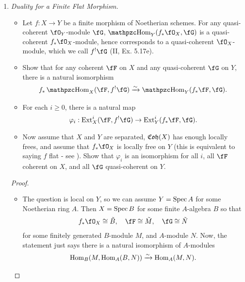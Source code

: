 \documentclass[a4paper]{article}
\begin{document}
\begin{enumerate} [label=\textbf{\arabic*.}, leftmargin=0em]
  \item[\textbf{10.}] \textit{Duality for a Finite Flat Morphism.}
        \begin{itemize}
          \item[(a)] Let $f : X \to Y$ be a finite morphism of Noetherian schemes. For any quasi-coherent $\fO_Y$-module $\fG$, $\rHom_Y(f_*\fO_X, \fG)$ is a quasi-coherent $f_*\fO_X$-module, hence corresponds to a quasi-coherent $\fO_X$-module, which we call $f^!\fG$ (II, Ex. 5.17e).
          \item[(b)] Show that for any coherent $\fF$ on $X$ and any quasi-coherent $\fG$ on $Y$, there is a natural isomorphism
                \begin{equation*}
                  f_*\rHom_X(\fF, f^!\fG) \xrightarrow{\sim} \rHom_Y(f_* \fF, \fG).
                \end{equation*}
          \item[(c)] For each $i \geq 0$, there is a natural map
                \begin{equation*}
                  \varphi_i : \Ext_X^i(\fF, f^!\fG) \to \Ext_Y^i(f_* \fF, \fG).
                \end{equation*}
          \item[(d)] Now assume that $X$ and $Y$ are separated, $\mathfrak{Coh}(X)$ has enough locally frees, and assume that $f_*\fO_X$ is locally free on $Y$ (this is equivalent to saying $f$ flat - see ). Show that $\varphi_i$ is an isomorphism for all $i$, all $\fF$ coherent on $X$, and all $\fG$ quasi-coherent on $Y$.
        \end{itemize}

        \begin{proof} $ $ \vspace{0pt}
          \begin{itemize} [leftmargin=0cm]
            \item[(b)] The question is local on $Y$, so we can assume $Y = \operatorname{Spec}{A}$ for some Noetherian ring $A$.
                  Then $X = \operatorname{Spec}{B}$ for some finite $A$-algebra $B$ so that $$f_*\fO_X \cong \tilde{B}, \quad \fF \cong \tilde{M}, \quad \fG \cong \tilde{N}$$ for some finitely generated $B$-module $M$, and $A$-module $N$.
                  Now, the statement just says there is a natural isomorphism of $A$-modules
                  \begin{equation*}
                    \operatorname{Hom}_B(M, \operatorname{Hom}_A(B, N)) \xrightarrow{\sim} \operatorname{Hom}_A(M, N).
                  \end{equation*}


\end{itemize}
\end{proof}
\end{enumerate}
\end{document}
